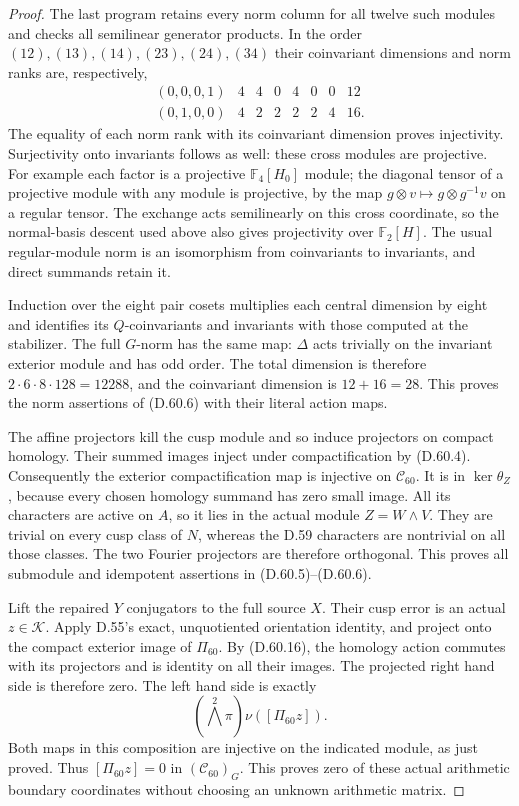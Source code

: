 \begin{proof}
The last program retains every norm column for
all twelve such modules and
checks all semilinear generator
products. In the order
\((12),(13),(14),(23),(24),(34)\)
their coinvariant dimensions
and norm ranks are, respectively,
\[
 \begin{array}{c|rrrrrr|r}
  (0,0,0,1)&4&4&0&4&0&0&12\\
  (0,1,0,0)&4&2&2&2&2&4&16.
 \end{array}
 \tag{D.60.22}
\]
The equality of each norm rank
with its coinvariant dimension
proves injectivity. Surjectivity
onto invariants follows as well:
these cross modules are projective.
For example each factor is a
projective \(\mathbb F_4[H_0]\)
module; the diagonal tensor of
a projective module with any
module is projective, by the
map \(g\otimes v\mapsto
g\otimes g^{-1}v\) on a
regular tensor. The exchange
acts semilinearly on this
cross coordinate, so the
normal-basis descent used above
also gives projectivity over
\(\mathbb F_2[H]\).
The usual regular-module norm
is an isomorphism from
coinvariants to invariants,
and direct summands retain it.

Induction over the eight pair
cosets multiplies each central
dimension by eight and identifies
its \(Q\)-coinvariants and
invariants with those computed
at the stabilizer. The full
\(G\)-norm has the same map:
\(\Delta\) acts trivially on
the invariant exterior module
and has odd order. The total
dimension is therefore
\(2\cdot6\cdot8\cdot128=12288\),
and the coinvariant dimension
is \(12+16=28\). This proves
the norm assertions of (D.60.6)
with their literal action maps.

The affine projectors kill
the cusp module and so induce
projectors on compact homology.
Their summed images inject
under compactification by
(D.60.4). Consequently the
exterior compactification map
is injective on \(\mathcal C_{60}\).
It is in \(\ker\theta_Z\),
because every chosen homology
summand has zero small image.
All its characters are active
on \(A\), so it lies in the
actual module \(Z=W\wedge V\).
They are trivial on every
cusp class of \(N\), whereas
the D.59 characters are
nontrivial on all those classes.
The two Fourier projectors
are therefore orthogonal.
This proves all submodule and
idempotent assertions in
(D.60.5)--(D.60.6).

Lift the repaired \(Y\)
conjugators to the full source
\(X\). Their cusp error is
an actual \(z\in\mathcal K\).
Apply D.55's exact, unquotiented
orientation identity, and
project onto the compact
exterior image of \(\Pi_{60}\).
By (D.60.16), the homology
action commutes with its
projectors and is identity
on all their images. The
projected right hand side is
therefore zero. The left hand
side is exactly
\[
            (\bigwedge^2\pi)\nu([\Pi_{60}z]).
 \tag{D.60.23}
\]
Both maps in this composition
are injective on the indicated
module, as just proved. Thus
\([\Pi_{60}z]=0\) in
\((\mathcal C_{60})_G\).
This proves zero of these
actual arithmetic boundary
coordinates without choosing
an unknown arithmetic matrix.


\end{proof}
